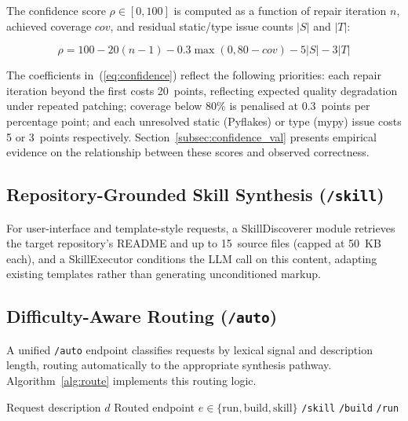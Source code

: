 \documentclass[conference]{IEEEtran}
\begin{document}
The confidence score $\rho \in [0, 100]$ is computed as a function of
repair iteration $n$, achieved coverage $cov$, and residual static/type
issue counts $|S|$ and $|T|$:

\begin{equation}
\rho = 100 - 20(n-1) - 0.3\max(0, 80 - cov) - 5|S| - 3|T|
\label{eq:confidence}
\end{equation}

The coefficients in~(\ref{eq:confidence}) reflect the following
priorities: each repair iteration beyond the first costs 20~points,
reflecting expected quality degradation under repeated patching; coverage
below 80\% is penalised at 0.3~points per percentage point; and each
unresolved static (Pyflakes) or type (mypy) issue costs 5 or 3~points
respectively.
Section~\ref{subsec:confidence_val} presents empirical evidence on the
relationship between these scores and observed correctness.

\subsection{Repository-Grounded Skill Synthesis (\texttt{/skill})}
\label{subsec:skill}

For user-interface and template-style requests, a SkillDiscoverer module
retrieves the target repository's README and up to 15~source files
(capped at 50~KB each), and a SkillExecutor conditions the LLM call on
this content, adapting existing templates rather than generating
unconditioned markup.

\subsection{Difficulty-Aware Routing (\texttt{/auto})}
\label{subsec:auto}

A unified \texttt{/auto} endpoint classifies requests by lexical signal
and description length, routing automatically to the appropriate synthesis
pathway.
Algorithm~\ref{alg:route} implements this routing logic.

\begin{algorithm}
\caption{Automatic Routing (\texttt{/auto})}
\label{alg:route}
\begin{algorithmic}[1]
\REQUIRE Request description $d$
\ENSURE Routed endpoint $e \in \{\text{run}, \text{build}, \text{skill}\}$
  \RETURN \texttt{/skill}
  \RETURN \texttt{/build}
\ELSE
  \RETURN \texttt{/run}
\ENDIF
\end{algorithmic}
\end{algorithm}
\end{document}
